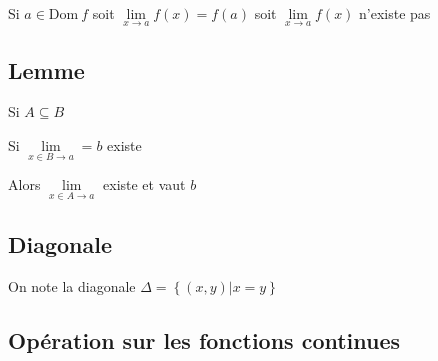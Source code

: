 \documentclass[a4paper,10pt]{article}
\newcommand{\ap}{\rightarrow}
\newcommand{\Dom}{\mathrm{Dom}\:}
\newcommand{\R}{\mathbb{R}}
\newcommand{\tset}[1]{\left\lbrace #1 \right\rbrace}
\newcommand{\conv}[1]{\mathop{\longrightarrow}\limits_{#1}}
\newcommand{\clim}[1]{\lim\limits_{#1}}
\begin{document}
Si $a \in \Dom f$ soit $\clim{x \ap a} f(x) = f(a)$ soit $\clim{x \ap a} f(x)$ n'existe pas

 







\subsection{Lemme}

Si $A \subseteq B$

Si $\clim{x \in B \ap a} = b$ existe

Alors $\clim{x \in A \ap a}$ existe et vaut $b$

\subsection{Diagonale}

On note la diagonale $\Delta = \tset{(x,y) \vert x = y}$









\subsection{Opération sur les fonctions continues}
\end{document}
